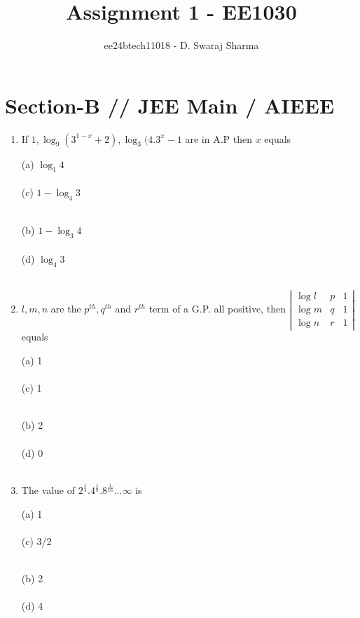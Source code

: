 \documentclass[journal,12pt,twocolumn]{IEEEtran}
\theoremstyle{remark}
\begin{document}

\vspace{3cm}

\title{Assignment 1 - EE1030}
\author{ee24btech11018 - D. Swaraj Sharma}
\maketitle
\newpage
\bigskip

\renewcommand{\thefigure}{\theenumi}
\renewcommand{\thetable}{\theenumi}

\section*{\textbf{Section-B} // \textbf{JEE Main} / \textbf{AIEEE}}

\begin{enumerate}[label=\textcolor{magenta}{\arabic*.}]
\newcommand{\question}[6]{
	 #1  \textcolor {magenta}{\rightline{#2\quad}} \\ 
\begin{minipage}{0.2\textwidth}
(a) #3 \\ \\
(c) #5 \\ \\
\end{minipage}
\hfill
\begin{minipage}{0.2\textwidth}
(b) #4 \\ \\
(d) #6 \\ \\
\end{minipage}

}

\item \question{If $ 1, \log_9 (3^{1-x} +2), \log_3 (4.3^x -1$ are in A.P then $x$ equals}{[2002]}
  {$\log_1 4$}
  {$1-\log_3 4$}
  {$1-\log_4 3$}
  {$\log_4 3$}

\item \question{$l, m, n$ are the $p^{th}, q^{th}$ and $r^{th}$ term of a G.P. all positive, then $\left|\begin{matrix} \log l & p & 1 \\ \log m & q & 1 \\ \log n & r & 1 \end{matrix}\right|$ equals}{[2002]}
{1}
{2}
{1}
{0}

\item \question{The value of $2^{\frac{1}{4}} . 4^{\frac{1}{8}} . 8^{\frac{1}{16}} \ldots \infty$ is}{[2002]}
  {1}
  {2}
  {3/2}
  {4}


\end{enumerate}
\end{document}
